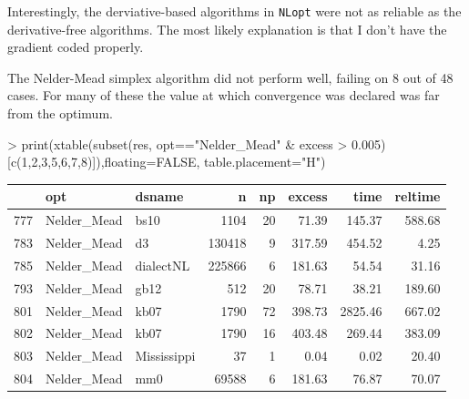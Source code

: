 \documentclass[article]{jss}
\begin{document}
Interestingly, the derviative-based algorithms in \texttt{NLopt} were
not as reliable as the derivative-free algorithms. The most likely
explanation is that I don't have the gradient coded properly.

The Nelder-Mead simplex algorithm did not perform well, failing on 8 out
of 48 cases. For many of these the value at which convergence was
declared was far from the optimum.

\begin{Schunk}
\begin{Sinput}
> print(xtable(subset(res, opt=="Nelder_Mead" & excess > 0.005)[c(1,2,3,5,6,7,8)]),floating=FALSE, table.placement="H")
\end{Sinput}
\begin{tabular}{rllrrrrr}
  \hline
 & opt & dsname & n & np & excess & time & reltime \\ 
  \hline
777 & Nelder\_Mead & bs10 & 1104 &  20 & 71.39 & 145.37 & 588.68 \\ 
  783 & Nelder\_Mead & d3 & 130418 &   9 & 317.59 & 454.52 & 4.25 \\ 
  785 & Nelder\_Mead & dialectNL & 225866 &   6 & 181.63 & 54.54 & 31.16 \\ 
  793 & Nelder\_Mead & gb12 & 512 &  20 & 78.71 & 38.21 & 189.60 \\ 
  801 & Nelder\_Mead & kb07 & 1790 &  72 & 398.73 & 2825.46 & 667.02 \\ 
  802 & Nelder\_Mead & kb07 & 1790 &  16 & 403.48 & 269.44 & 383.09 \\ 
  803 & Nelder\_Mead & Mississippi &  37 &   1 & 0.04 & 0.02 & 20.40 \\ 
  804 & Nelder\_Mead & mm0 & 69588 &   6 & 181.63 & 76.87 & 70.07 \\ 
   \hline
\end{tabular}\end{Schunk}
\end{document}
